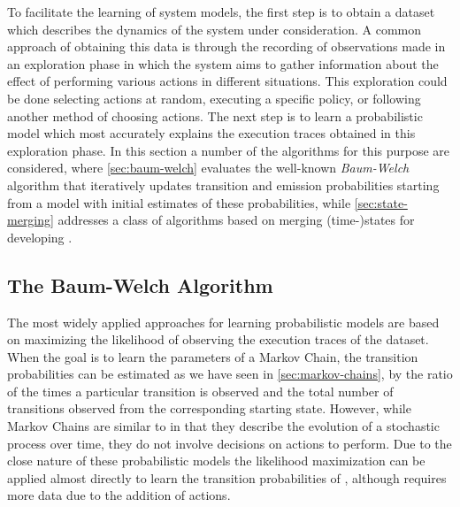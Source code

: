 To facilitate the learning of system models, the first step is to obtain a dataset which describes the dynamics of the system under consideration.
A common approach of obtaining this data is through the recording of observations made in an exploration phase in which the system aims to gather information about the effect of performing various actions in different situations.
This exploration could be done selecting actions at random, executing a specific policy, or following another method of choosing actions.
The next step is to learn a probabilistic model which most accurately explains the execution traces obtained in this exploration phase.
In this section a number of the algorithms for this purpose are considered, where \autoref{sec:baum-welch} evaluates the well-known \textit{Baum-Welch} algorithm that iteratively updates transition and emission probabilities starting from a model with initial estimates of these probabilities, while \autoref{sec:state-merging} addresses a class of algorithms based on merging (time-)states for developing .

\subsection{The Baum-Welch Algorithm}
\label{sec:baum-welch}

The most widely applied approaches for learning probabilistic models are based on maximizing the likelihood of observing the execution traces of the dataset.
When the goal is to learn the parameters of a Markov Chain, the transition probabilities can be estimated as we have seen in \autoref{sec:markov-chains}, by the ratio of the times a particular transition is observed and the total number of transitions observed from the corresponding starting state.
However, while Markov Chains are similar to  in that they describe the evolution of a stochastic process over time, they do not involve decisions on actions to perform.
Due to the close nature of these probabilistic models the likelihood maximization can be applied almost directly to learn the transition probabilities of , although requires more data due to the addition of actions.

